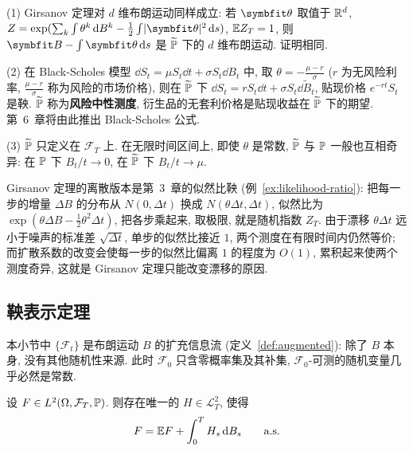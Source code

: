 \begin{remark}
(1) Girsanov 定理对 $d$ 维布朗运动同样成立: 若 $\rvec{\theta}$ 取值于 $\R^d$, $Z=\exp(\sum_k\int\theta^k\dd B^k-\frac{1}{2}\int\abs{\rvec{\theta}}^2\dd s)$, $\E Z_T=1$, 则 $\rvec{B}-\int\rvec{\theta}\dd s$ 是 $\widetilde{\P}$ 下的 $d$ 维布朗运动. 证明相同.

(2) 在 Black-Scholes 模型 $\dd S_t=\mu S_t\dd t+\sigma S_t\dd B_t$ 中, 取 $\theta=-\frac{\mu-r}{\sigma}$ ($r$ 为无风险利率, $\frac{\mu-r}{\sigma}$ 称为风险的市场价格), 则在 $\widetilde{\P}$ 下 $\dd S_t=rS_t\dd t+\sigma S_t\dd\widetilde{B}_t$, 贴现价格 $e^{-rt}S_t$ 是鞅. $\widetilde{\P}$ 称为\textbf{风险中性测度}, 衍生品的无套利价格是贴现收益在 $\widetilde{\P}$ 下的期望. 第~6~章将由此推出 Black-Scholes 公式.

(3) $\widetilde{\P}$ 只定义在 $\mathcal{F}_T$ 上. 在无限时间区间上, 即使 $\theta$ 是常数, $\widetilde{\P}$ 与 $\P$ 一般也互相奇异: 在 $\P$ 下 $B_t/t\to0$, 在 $\widetilde{\P}$ 下 $B_t/t\to\mu$.
\end{remark}

\begin{intuition}
Girsanov 定理的离散版本是第~3~章的似然比鞅 (例~\ref{ex:likelihood-ratio}): 把每一步的增量 $\Delta B$ 的分布从 $N(0,\Delta t)$ 换成 $N(\theta\Delta t,\Delta t)$, 似然比为 $\exp(\theta\Delta B-\frac{1}{2}\theta^2\Delta t)$, 把各步乘起来, 取极限, 就是随机指数 $Z_T$. 由于漂移 $\theta\Delta t$ 远小于噪声的标准差 $\sqrt{\Delta t}$, 单步的似然比接近 $1$, 两个测度在有限时间内仍然等价; 而扩散系数的改变会使每一步的似然比偏离 $1$ 的程度为 $O(1)$, 累积起来使两个测度奇异, 这就是 Girsanov 定理只能改变漂移的原因.
\end{intuition}

\subsection{鞅表示定理}

本小节中 $\{\mathcal{F}_t\}$ 是布朗运动 $B$ 的扩充信息流 (定义~\ref{def:augmented}): 除了 $B$ 本身, 没有其他随机性来源. 此时 $\mathcal{F}_0$ 只含零概率集及其补集, $\mathcal{F}_0$-可测的随机变量几乎必然是常数.

\begin{theorem}[It\^o 鞅表示定理]\label{thm:mart-rep}
设 $F\in L^2(\Omega,\mathcal{F}_T,\P)$. 则存在唯一的 $H\in\mathscr{L}^2_T$, 使得
\[
F=\E F+\int_0^TH_s\dd B_s\qquad\as
\]
\end{theorem}

